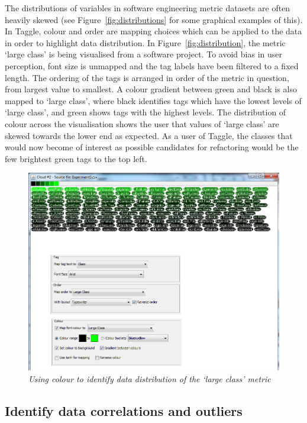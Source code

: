 The distributions of variables in software engineering metric datasets are often heavily skewed (see Figure~\vref{fig:distributions} for some graphical examples of this). In Taggle, colour and order are mapping choices which can be applied to the data in order to highlight data distribution. In Figure~\vref{fig:distribution}, the metric `large class' is being visualised from a software project. To avoid bias in user perception, font size is unmapped and the tag labels have been filtered to a fixed length. The ordering of the tags is arranged in order of the metric in question, from largest value to smallest. A colour gradient between green and black is also mapped to `large class', where black identifies tags which have the lowest levels of `large class', and green shows tags with the highest levels. The distribution of colour across the visualisation shows the user that values of `large class' are skewed towards the lower end as expected. As a user of Taggle, the classes that would now become of interest as possible candidates for refactoring would be the few brightest green tags to the top left.

\begin{figure}[!htb]
  	\centering
   	\includegraphics[scale=0.40]{distribution.png}
  	\caption{\textit{Using colour to identify data distribution of the `large class' metric}}
	\label{fig:distribution}
\end{figure}

\subsection{Identify data correlations and outliers}\label{sect:datacorrelation}

